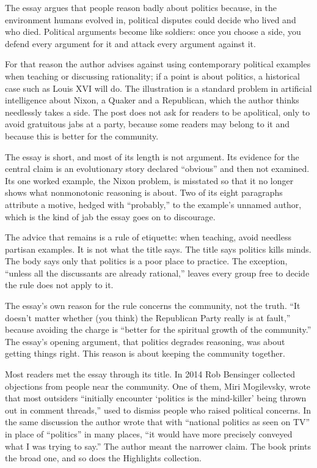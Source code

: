 \begin{afterword}
\summaryhead

The essay argues that people reason badly about politics because, in the environment humans evolved in, political disputes could decide who lived and who died. Political arguments become like soldiers: once you choose a side, you defend every argument for it and attack every argument against it.

For that reason the author advises against using contemporary political examples when teaching or discussing rationality; if a point is about politics, a historical case such as Louis XVI will do. The illustration is a standard problem in artificial intelligence about Nixon, a Quaker and a Republican, which the author thinks needlessly takes a side. The post does not ask for readers to be apolitical, only to avoid gratuitous jabs at a party, because some readers may belong to it and because this is better for the community.

\responsehead

The essay is short, and most of its length is not argument. Its evidence for the central claim is an evolutionary story declared ``obvious'' and then not examined. Its one worked example, the Nixon problem, is misstated so that it no longer shows what nonmonotonic reasoning is about. Two of its eight paragraphs attribute a motive, hedged with ``probably,'' to the example's unnamed author, which is the kind of jab the essay goes on to discourage.

The advice that remains is a rule of etiquette: when teaching, avoid needless partisan examples. It is not what the title says. The title says politics kills minds. The body says only that politics is a poor place to practice. The exception, ``unless all the discussants are already rational,'' leaves every group free to decide the rule does not apply to it.

The essay's own reason for the rule concerns the community, not the truth. ``It doesn't matter whether (you think) the Republican Party really is at fault,'' because avoiding the charge is ``better for the spiritual growth of the community.'' The essay's opening argument, that politics degrades reasoning, was about getting things right. This reason is about keeping the community together.

Most readers met the essay through its title. In 2014 Rob Bensinger collected objections from people near the community. One of them, Miri Mogilevsky, wrote that most outsiders ``initially encounter `politics is the mind-killer' being thrown out in comment threads,'' used to dismiss people who raised political concerns. In the same discussion the author wrote that with ``national politics as seen on TV'' in place of ``politics'' in many places, ``it would have more precisely conveyed what I was trying to say.'' The author meant the narrower claim. The book prints the broad one, and so does the Highlights collection.


\end{afterword}
